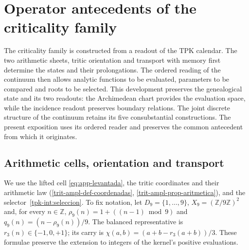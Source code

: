 \providecommand{\ZZ}{\mathbb Z}
\providecommand{\RR}{\mathbb R}
\providecommand{\FF}{\mathbb F}
\providecommand{\APP}{\mathrm{APP}}
\providecommand{\TPK}{\mathrm{TPK}}
\providecommand{\TRIT}{\{-1,0,+1\}}

\section{Operator antecedents of the criticality family}
\label{hmtfg:antecedentes-operatorios}

The criticality family is constructed from a readout of the TPK calendar. The two arithmetic sheets, tritic orientation and transport with memory first determine the states and their prolongations. The ordered reading of the continuum then allows analytic functions to be evaluated, parameters to be compared and roots to be selected. This development preserves the genealogical state and its two readouts: the Archimedean chart provides the evaluation space, while the incidence readout preserves boundary relations. The joint discrete structure of the continuum retains its five consubstantial constructions. The present exposition uses its ordered reader and preserves the common antecedent from which it originates.

\subsection{Arithmetic cells, orientation and transport}
\label{hmtfg:app-trit-transporte}

We use the lifted cell \eqref{eq:app-levantada}, the tritic coordinates and their arithmetic law (\ref{trit-ampl-def-coordenadas}, \ref{trit-ampl-prop-aritmetica}), and the selector~\ref{tpk-int:seleccion}. To fix notation, let $D_9=\{1,\ldots,9\}$, $X_9=(\mathbb Z/9\mathbb Z)^2$ and, for every $n\in\mathbb Z$, $\rho_9(n)=1+((n-1)\bmod9)$ and $q_9(n)=(n-\rho_9(n))/9$. The balanced representative is $r_3(n)\in\{-1,0,+1\}$; its carry is $\chi(a,b)=(a+b-r_3(a+b))/3$. These formulae preserve the extension to integers of the kernel's positive evaluations.


